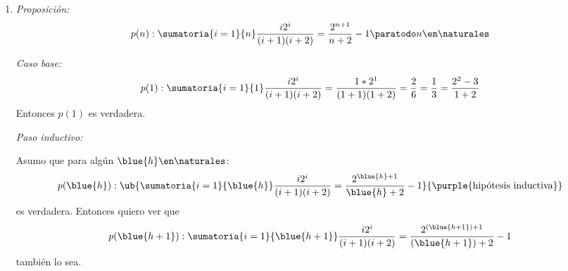 \begin{enumerate}[label=\roman*)]
        \textit{Paso inductivo: } Asumo que
        $$
          \ub{p(\blue{k}):  \sumatoria{i=1}{n} (2i+1)3^{i - 1} = \blue{k}3^{\blue{k}}}{\text{\purple{hipótesis inductiva}}}
        $$
        es verdadera. Entonces quiero ver que
        $$
          p(\blue{k+1}):
          \sumatoria{1}{\blue{k+1}}(2i+1)3^{i - 1} = (\blue{k+1})3^{\blue{k+1}}
        $$
        también lo sea.\par

        Muy parecido al ejercicio anterior:
        $$
          \sumatoria{i=1}{k+1} (2i+1)3^{i - 1} = \sumatoria{i=1}{k} (2i+1)3^{i - 1} + (2(k+1) + 1)3^{(k+1) - 1}
          \igual{\purple{HI}}[\red{!}]
          k3^k + 3^k (2k + 3)
          \igual{\red{!!!}}
          (k+1) \cdot 3^{k+1}
        $$
        Y sí, en el \red{!!!} hay más cuentas. Pero ya a esta altura te vas dando cuenta de que la parte de \textit{inducción} no
        estaría siendo el desafío, sino que (en estos ejercicios) son las cuentas, por eso \underline{mirá fijo las cuentas} y dale tiempo  a tu  para que
        encuentre el factor común etc \href{\justDoIt}{¡Curtite, vieja!}.
        Las cuentas son en gran medida lo que complica los parciales, no tanto los temas.\par

        Dado que $p(1),\, p(k) \ytext p(k+1)$ resultaron verdaderas, por el criterio de inducción también lo es $p(n) \en \naturales$

  \item
        \textit{Proposición: }
        $$
          p(n):
          \sumatoria{i=1}{n} \frac{i2^i}{(i + 1)(i+2)} = \frac{2^{n+1}}{n+2} - 1 \paratodo n \en \naturales
        $$

        \textit{Caso base: }
        $$
          p(1) :
          \sumatoria{i=1}{1} \frac{i2^i}{(i + 1)(i+2)} = \frac{1*2^1}{(1+1)(1+2)} = \frac{2}{6} = \frac{1}{3} = \frac{2^2 - 3}{1 + 2}
        $$
        Entonces $p(1)$ es verdadera.

        \medskip

        \textit{Paso inductivo: }

        Asumo que para algún $\blue{h} \en \naturales$:
        $$
          p(\blue{h}) :
          \ub{
            \sumatoria{i=1}{\blue{h}} \frac{i2^i}{(i + 1)(i+2)} = \frac{2^{\blue{h}+1}}{\blue{h}+2} -1
          }{
            \text{\purple{hipótesis inductiva}}
          }
        $$
        es verdadera. Entonces quiero ver que
        $$
          p(\blue{h+1}) :
          \sumatoria{i=1}{\blue{h+1}} \frac{i2^i}{(i + 1)(i+2)} = \frac{2^{(\blue{h+1})+1}}{(\blue{h+1}) + 2} - 1
        $$
        también lo sea.


\end{enumerate}
